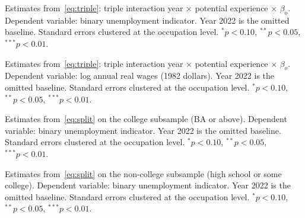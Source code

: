 \documentclass[11pt]{article}
\theoremstyle{plain}
\theoremstyle{remark}
\begin{document}
\begin{table}[H]
\begin{center}
\caption{Estimates from~\eqref{eq:triple}: triple interaction year $\times$ potential experience $\times$ $\beta_o$. Dependent variable: binary unemployment indicator. Year 2022 is the omitted baseline. Standard errors clustered at the occupation level. $^{*}p<0.10$, $^{**}p<0.05$, $^{***}p<0.01$.}
\label{tab:unemp_exphet}
\resizebox{0.9\textwidth}{!}{}
\end{center}
\end{table}

\begin{table}[H]
\begin{center}
\caption{Estimates from~\eqref{eq:triple}: triple interaction year $\times$ potential experience $\times$ $\beta_o$. Dependent variable: log annual real wages (1982 dollars). Year 2022 is the omitted baseline. Standard errors clustered at the occupation level. $^{*}p<0.10$, $^{**}p<0.05$, $^{***}p<0.01$.}
\label{tab:lw_exphet}
\resizebox{0.9\textwidth}{!}{}
\end{center}
\end{table}

\begin{table}[H]
\begin{center}
\caption{Estimates from~\eqref{eq:split} on the college subsample (BA or above). Dependent variable: binary unemployment indicator. Year 2022 is the omitted baseline. Standard errors clustered at the occupation level. $^{*}p<0.10$, $^{**}p<0.05$, $^{***}p<0.01$.}
\label{tab:unemp_col}
\resizebox{0.9\textwidth}{!}{}
\end{center}
\end{table}

\begin{table}[H]
\begin{center}
\caption{Estimates from~\eqref{eq:split} on the non-college subsample (high school or some college). Dependent variable: binary unemployment indicator. Year 2022 is the omitted baseline. Standard errors clustered at the occupation level. $^{*}p<0.10$, $^{**}p<0.05$, $^{***}p<0.01$.}
\label{tab:unemp_noncol}
\resizebox{0.9\textwidth}{!}{}
\end{center}
\end{table}
\end{document}
